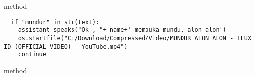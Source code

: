 \\
\\
\\
\\
\\
\\
\\
\\
\\
\\
\\
\\
\\
\\
\\
\\
\\
\\
\\
\\
\\
\\
\\
\\
\\
\\
\\
\\
\\
 method 
\begin{lstlisting}
  if "mundur" in str(text): 
    assistant_speaks("Ok , "+ name+' membuka mundul alon-alon')
    os.startfile("C:/Download/Compressed/Video/MUNDUR ALON ALON - ILUX ID (OFFICIAL VIDEO) - YouTube.mp4") 
    continue
\end{lstlisting}
 method 
\\
\\
\\
\\
\\
\\
\\
\\
\\
\\
\\
\\
\\
\\
\\
\\
\\
\\
\\
\\
\\
\\
\\
\\
